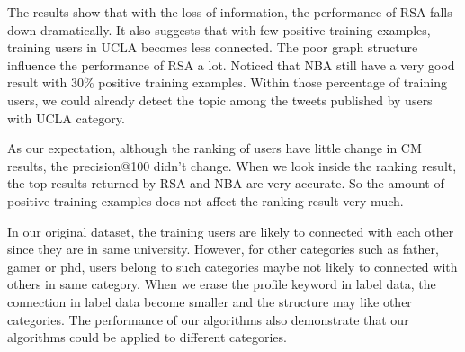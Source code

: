 \documentclass{article}
\begin{document}
The results show that with the loss of information, the performance of RSA falls down dramatically. It also suggests that with few positive training examples, training users in UCLA becomes less connected. The poor graph structure influence the performance of RSA a lot.
Noticed that NBA still have a very good result with $30\%$ positive training examples. Within those percentage of training users, we could already detect the topic among the tweets published by users with UCLA category.

As our expectation, although the ranking of users have little change in CM results, the precision@100 didn't change. When we look inside the ranking result, the top results returned by RSA and NBA are very accurate. So the amount of positive training examples does not affect the ranking result very much.

In our original dataset, the training users are likely to connected with each other since they are in same university. However, for other categories such as father, gamer or phd, users belong to such categories maybe not likely to connected with others in same category. When we erase the profile keyword in label data, the connection in label data become smaller and the structure may like other categories. The performance of our algorithms also demonstrate that our algorithms could be applied to different categories.

\ifx \allfiles \undefined
\end{document}
